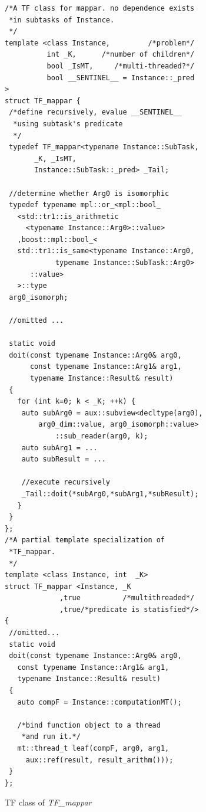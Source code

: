 \documentclass[10pt, conference, compsocconf]{IEEEtran}
\begin{document}
\begin{figure}[!htp]
\begin{minipage}[tb]{\linewidth}
\makebox[\textwidth]{\hrulefill}
\begin{small}
\begin{verbatim}
/*A TF class for mappar. no dependence exists
 *in subtasks of Instance. 
 */
template <class Instance,         /*problem*/
          int _K,      /*number of children*/
          bool _IsMT,     /*multi-threaded?*/
          bool __SENTINEL__ = Instance::_pred
>
struct TF_mappar {
 /*define recursively, evalue __SENTINEL__ 
  *using subtask's predicate
  */
 typedef TF_mappar<typename Instance::SubTask, 
       _K, _IsMT, 
       Instance::SubTask::_pred> _Tail;

 //determine whether Arg0 is isomorphic
 typedef typename mpl::or_<mpl::bool_
   <std::tr1::is_arithmetic
     <typename Instance::Arg0>::value>
   ,boost::mpl::bool_<
   std::tr1::is_same<typename Instance::Arg0, 
            typename Instance::SubTask::Arg0>
      ::value>
   >::type
 arg0_isomorph;

 //omitted ...

 static void 
 doit(const typename Instance::Arg0& arg0, 
      const typename Instance::Arg1& arg1, 
      typename Instance::Result& result)
 {
   for (int k=0; k < _K; ++k) {
    auto subArg0 = aux::subview<decltype(arg0), 
        arg0_dim::value, arg0_isomorph::value>
            ::sub_reader(arg0, k); 
    auto subArg1 = ... 
    auto subResult = ...
    
    //execute recursively
    _Tail::doit(*subArg0,*subArg1,*subResult);
   }
 }
};
/*A partial template specialization of
 *TF_mappar.
 */
template <class Instance, int  _K>
struct TF_mappar <Instance, _K 
             ,true          /*multithreaded*/ 
             ,true/*predicate is statisfied*/> 
{
 //omitted...
 static void 
 doit(const typename Instance::Arg0& arg0, 
   const typename Instance::Arg1& arg1,
   typename Instance::Result& result)
 {
   auto compF = Instance::computationMT();

   /*bind function object to a thread 
    *and run it.*/
   mt::thread_t leaf(compF, arg0, arg1, 
     aux::ref(result, result_arithm()));
 }
};
\end{verbatim}
\end{small}
\vspace{-3ex}\makebox[\textwidth]{\hrulefill}
\end{minipage}
\caption{TF class of \textsl{TF\_mappar}}\label{lst:mappar}
\end{figure}
\end{document}
